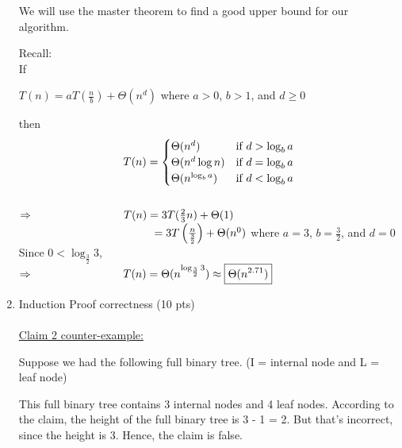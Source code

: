 \documentclass[11pt]{article}
\begin{document}
\begin{enumerate}
We will use the master theorem to find a good upper bound for our algorithm.

Recall:\\ \-\hspace{2cm} If\begin{center} ${T(n) = aT(\frac{n}{b}) + \Theta(n^d)}$ where ${a > 0}$, ${b > 1}$, and ${d \geq 0}$\\
\end{center} \-\hspace{2cm}
then\[ T(n) =\begin{cases} \Theta(n^d)&\text{if $ $$d > \log_b a$$ $}\\ \Theta(n^d \log n)&\text{if $ $$d = \log_b a$$ $}\\ \Theta(n^{\log_b a})&\text{if $ $$d < \log_b a$$ $}\end{cases}\]\\
${ \Rightarrow \-\hspace{2.85cm} T(n) = 3T(\frac{2}{3}n)+\Theta(1)}$ \\ ${ \-\hspace{4.28cm}= 3T \left(\frac{n}{\frac{3}{2}}\right)+\Theta(n^0)}$  where ${a = 3}$, ${b = \frac{3}{2}}$, and ${d = 0}$ \\ 
\-\hspace{2cm} Since ${0 < \log_\frac{3}{2} 3}$,\\
${ \Rightarrow \-\hspace{2.85cm} T(n) = \Theta(n^{\log_\frac{3}{2} 3}) \approx \boxed{\Theta(n^{2.71})}}$

\item Induction Proof correctness (10 pts)\\
\- \\
\underline{Claim 2 counter-example:}


Suppose we had the following full binary tree. (I = internal node and L = leaf node)
\begin{center}
\end{center}
This full binary tree contains 3 internal nodes and 4 leaf nodes. According to the claim, the height of the full binary tree is 3 - 1 = 2. But that's incorrect, since the height is 3. Hence, the claim is false.


\end{enumerate}
\end{document}
